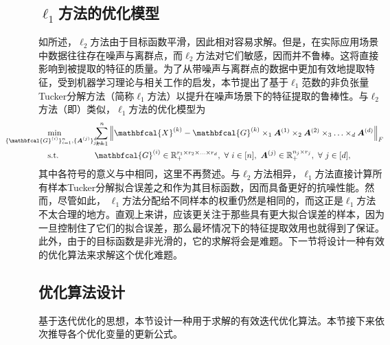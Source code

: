 \subsection{$\ell_{1}$方法的优化模型}\label{sec:l1}
如所述，$\ell_2$方法由于目标函数平滑，因此相对容易求解。但是，在实际应用场景中数据往往存在噪声与离群点，而$\ell_2$方法对它们敏感，因而并不鲁棒。这将直接影响到被提取的特征的质量。为了从带噪声与离群点的数据中更加有效地提取特征，受到机器学习理论与相关工作的启发，本节提出了基于$\ell_{1}$范数的非负张量Tucker分解方法（简称$\ell_{1}$方法）以提升在噪声场景下的特征提取的鲁棒性。与$\ell_{2}$方法（即）类似，$\ell_{1}$方法的优化模型为
\begin{equation}\label{eq:L1}
\hspace{1em}
    \begin{aligned}
    &\underset{\mathclap{\{\mathbfcal{G}^{(i)}\}_{i=1}^{n}, \{\boldsymbol{A}^{(j)}\}_{j=1}^{d}}}{\min} \qquad\quad &&\sum_{k=1}^{n}\left\|\mathbfcal{X}^{(k)}-\mathbfcal{G}^{(k)} \times_{1} \boldsymbol{A}^{(1)} \times_{2} \boldsymbol{A}^{(2)} \times_{3} \ldots \times_{d} \boldsymbol{A}^{(d)}\right\|_{F} \\
    &\text{s.t.} && \mathbfcal{G}^{(i)}\in\mathbb{R}_{+}^{r_1 \times r_2 \times \ldots \times r_d},~\forall~i\in[n] ,~\boldsymbol{A}^{(j)}\in \mathbb{R}_{+}^{n_j \times r_j},~\forall~j\in[d],
    \end{aligned}
\end{equation}
其中各符号的意义与中相同，这里不再赘述。与$\ell_{2}$方法相异，$\ell_{1}$方法直接计算所有样本Tucker分解拟合误差之和作为其目标函数，因而具备更好的抗噪性能。然而，尽管如此，
$\ell_{1}$方法分配给不同样本的权重仍然是相同的，而这正是$\ell_{1}$方法不太合理的地方。直观上来讲，应该更关注于那些具有更大拟合误差的样本，因为一旦控制住了它们的拟合误差，那么最坏情况下的特征提取效用也就得到了保证。此外，由于的目标函数是非光滑的，它的求解将会是难题。下一节将设计一种有效的优化算法来求解这个优化难题。

\subsection{优化算法设计}\label{sec:l1-algodesign}
基于迭代优化的思想，本节设计一种用于求解的有效迭代优化算法。本节接下来依次推导各个优化变量的更新公式。

